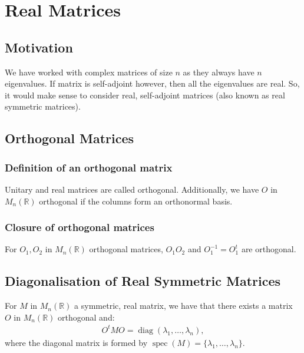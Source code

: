 \documentclass[a4paper, 12pt, twoside]{article}
\DeclareMathOperator{\Diag}{diag}
\DeclareMathOperator{\Spec}{spec}
\begin{document}
\section{Real Matrices}

\subsection{Motivation}

We have worked with complex matrices of size $n$ as they always have
$n$ eigenvalues. If matrix is self-adjoint however, then all the
eigenvalues are real. So, it would make sense to consider real,
self-adjoint matrices (also known as real symmetric matrices).

\subsection{Orthogonal Matrices}

\subsubsection{Definition of an orthogonal matrix}

Unitary and real matrices are called orthogonal. Additionally,
we have $O$ in $M_n(\mathbb{R})$ orthogonal if the columns form
an orthonormal basis.

\subsubsection{Closure of orthogonal matrices}

For $O_1, O_2$ in $M_n(\mathbb{R})$ orthogonal matrices, $O_1O_2$ and
$O_1^{-1} = O_1^t$ are orthogonal.

\subsection{Diagonalisation of Real Symmetric Matrices}

For $M$ in $M_n(\mathbb{R})$ a symmetric, real matrix, we have that 
there exists a matrix $O$ in $M_n(\mathbb{R})$ orthogonal and:
\begin{align*}
  O^tMO = \Diag(\lambda_1, \ldots, \lambda_n),
\end{align*}
where the diagonal matrix is formed by 
$\Spec(M) = \{\lambda_1, \ldots, \lambda_n\}$.
\end{document}

